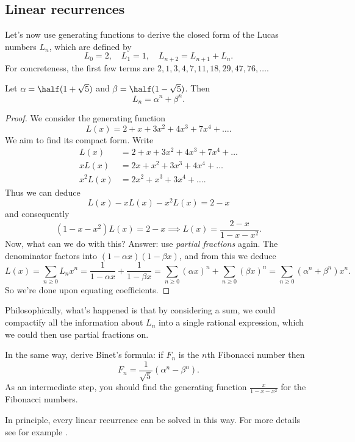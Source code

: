 \documentclass[11pt]{scrartcl}
\begin{document}
\subsection{Linear recurrences}
Let's now use generating functions to derive the closed form of
the Lucas numbers $L_n$, which are defined by
\[ L_0 = 2, \quad L_1 = 1, \quad L_{n+2} = L_{n+1} + L_n.\]
For concreteness, the first few terms are
$2, 1, 3, 4, 7, 11, 18, 29, 47, 76, \dots$.
\begin{theorem}
  Let $\alpha = \half(1+\sqrt5)$ and $\beta=\half(1-\sqrt5)$.
  Then
  \[ L_n = \alpha^n + \beta^n. \]
\end{theorem}
\begin{proof}
  We consider the generating function
  \[ L(x) = 2 + x + 3x^2 + 4x^3 + 7x^4 + \dots. \]
  We aim to find its compact form.
  Write
  \begin{align*}
    L(x) &= 2 + x + 3x^2 + 4x^3 + 7x^4 + \dots \\
    xL(x) &= 2x + x^2 + 3x^3 + 4x^4 + \dots \\
    x^2L(x) &= 2x^2 + x^3 + 3x^4 + \dots.
  \end{align*}
  Thus we can deduce
  \[ L(x) - xL(x) - x^2L(x) = 2-x \]
  and consequently
  \[ (1-x-x^2)L(x) = 2-x
    \implies L(x) = \frac{2-x}{1-x-x^2}. \]
  Now, what can we do with this?
  Answer: use \emph{partial fractions} again.
  The denominator factors into $(1-\alpha x)(1-\beta x)$,
  and from this we deduce
  \[
    L(x) = \sum_{n \ge 0} L_n x^n
    = \frac{1}{1-\alpha x} + \frac{1}{1 - \beta x}
    = \sum_{n \ge 0} (\alpha x)^n + \sum_{n \ge 0} (\beta x)^n
    = \sum_{n \ge 0} \left( \alpha^n + \beta^n \right)x^n.
  \]
  So we're done upon equating coefficients.
\end{proof}
Philosophically, what's happened is that by considering a sum,
we could compactify all the information about $L_n$ into a single
rational expression, which we could then use partial fractions on.

\begin{exercise}
  In the same way, derive Binet's formula:
  if $F_n$ is the $n$th Fibonacci number then
  \[ F_n = \frac{1}{\sqrt5}(\alpha^n-\beta^n). \]
  As an intermediate step,
  you should find the generating function $\frac{x}{1-x-x^2}$
  for the Fibonacci numbers.
\end{exercise}

In principle, every linear recurrence can be solved in this way.
For more details see for example \cite{ref:linear}.
\end{document}
